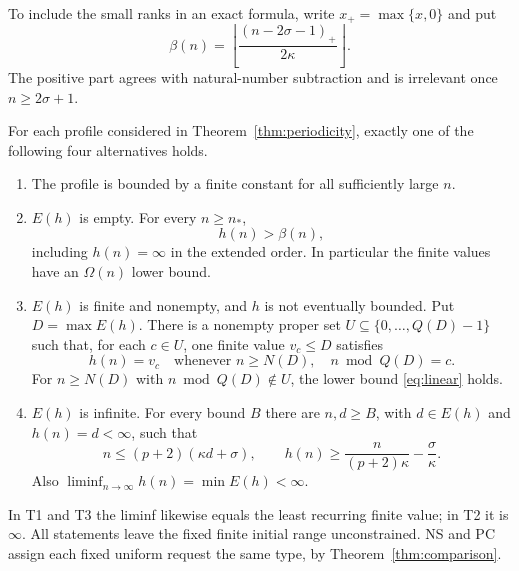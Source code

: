 To include the small ranks in an exact formula, write $x_+=\max\{x,0\}$
and put
\[
             \beta(n)=\left\lfloor
                       \frac{(n-2\sigma-1)_+}{2\kappa}
                       \right\rfloor.
\]
The positive part agrees with natural-number subtraction and is irrelevant
once $n\ge2\sigma+1$.

\begin{theorem}\label{thm:classification}
For each profile considered in Theorem~\ref{thm:periodicity}, exactly one
of the following four alternatives holds.
\begin{enumerate}[label=\textup{T\arabic*.}]
\item The profile is bounded by a finite constant for all sufficiently
large $n$.
\item $E(h)$ is empty. For every $n\ge n_*$,
\begin{equation}\label{eq:linear}
                              h(n)>\beta(n),
\end{equation}
including $h(n)=\infty$ in the extended order. In particular the finite
values have an $\Omega(n)$ lower bound.
\item $E(h)$ is finite and nonempty, and $h$ is not eventually bounded.
Put $D=\max E(h)$. There is a nonempty proper set
$U\subseteq\{0,\ldots,Q(D)-1\}$ such that, for each $c\in U$, one
finite value $v_c\le D$ satisfies
\[
        h(n)=v_c\quad\text{whenever }n\ge N(D),\quad n\bmod Q(D)=c.
\]
For $n\ge N(D)$ with $n\bmod Q(D)\notin U$, the lower bound
\eqref{eq:linear} holds.
\item $E(h)$ is infinite. For every bound $B$ there are $n,d\ge B$,
with $d\in E(h)$ and $h(n)=d<\infty$, such that
\begin{equation}\label{eq:peaks}
 n\le(p+2)(\kappa d+\sigma),\qquad
 h(n)\ge\frac{n}{(p+2)\kappa}-\frac{\sigma}{\kappa}.
\end{equation}
Also $\liminf_{n\to\infty}h(n)=\min E(h)<\infty$.
\end{enumerate}
In T1 and T3 the liminf likewise equals the least recurring finite value;
in T2 it is $\infty$. All statements leave the fixed finite initial
range unconstrained. NS and PC assign each fixed uniform request the
same type, by Theorem~\ref{thm:comparison}.
\end{theorem}
